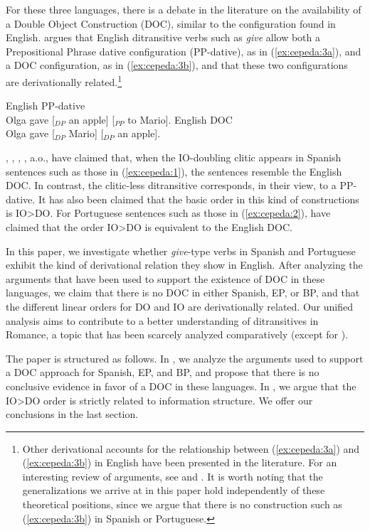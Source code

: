 \documentclass[output=paper,colorlinks,citecolor=brown,modfonts,nonflat]{langsci/langscibook}
\begin{document}
For these three languages, there is a debate in the literature on the availability of a Double Object Construction (DOC), similar to the configuration found in English. \citet{Larson1988,Larson2014} argues that English ditransitive verbs such as \textit{give} allow both a Prepositional Phrase dative configuration (PP-dative), as in (\ref{ex:cepeda:3a}), and a DOC configuration, as in (\ref{ex:cepeda:3b}), and that these two configurations are derivationally related.\footnote{Other derivational accounts for the relationship between (\ref{ex:cepeda:3a}) and (\ref{ex:cepeda:3b}) in English have been presented in the literature. For an interesting review of arguments, see \citet{RappaportHovavLevin2008} and \citet{Hallman2015}. It is worth noting that the generalizations we arrive at in this paper hold independently of these theoretical positions, since we argue that there is no construction such as (\ref{ex:cepeda:3b}) in Spanish or Portuguese.}

\ea%
    \label{ex:cepeda:3}
	\ea\label{ex:cepeda:3a}
	English PP-dative\\
		Olga gave [$_{DP}$ an apple] [$_{PP}$ to Mario].
	\ex\label{ex:cepeda:3b}
	English DOC\\
		Olga gave [$_{DP}$ Mario] [$_{DP}$ an apple].
	\z
\z

\citet{Demonte1995}, \citet{Bleam2003}, \citet{Cuervo2003}, \citet{Cuervo2010Proceedings}, a.o., have claimed that, when the IO-doubling clitic appears in Spanish sentences such as those in (\ref{ex:cepeda:1}), the sentences resemble the English DOC. In contrast, the clitic-less ditransitive corresponds, in their view, to a PP-dative. It has also been claimed that the basic order in this kind of constructions is IO>DO. For Portuguese sentences such as those in (\ref{ex:cepeda:2}), \citet{TorresMoraisSalles2010} have claimed that the order IO>DO is equivalent to the English DOC.

In this paper, we investigate whether \textit{give}-type verbs in Spanish and Portuguese exhibit the kind of derivational relation they show in English. After analyzing the arguments that have been used to support the existence of DOC in these languages, we claim that there is no DOC in either Spanish, EP, or BP, and that the different linear orders for DO and IO are derivationally related. Our unified analysis aims to contribute to a better understanding of ditransitives in Romance, a topic that has been scarcely analyzed comparatively (except for \citealt{Pineda2016}).

The paper is structured as follows. In , we analyze the arguments used to support a DOC approach for Spanish, EP, and BP, and propose that there is no conclusive evidence in favor of a DOC in these languages. In , we argue that the IO>DO order is strictly related to information structure. We offer our conclusions in the last section.
\end{document}
